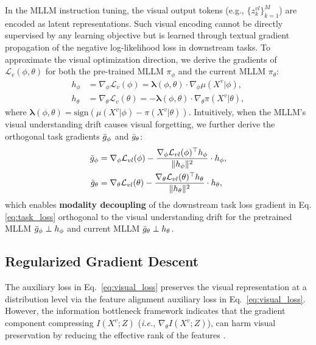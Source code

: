 In the MLLM instruction tuning, the visual output tokens (e.g., $\{z^{vl}_k\}_{k=1}^M$) are encoded as latent representations. 
Such visual encoding cannot be directly supervised by any learning objective but is learned through textual gradient propagation of the negative log-likelihood loss in downstream tasks. 
To approximate the visual optimization direction, we derive the gradients of $\mathcal{L}_v(\phi,\theta)$ for both the pre-trained MLLM $\pi_\phi$ and the current MLLM $\pi_\theta$:
\begin{align*}
    h_{\phi} &= \nabla_{\phi}\mathcal{L}_v(\phi) = \boldsymbol{\lambda}(\phi,\theta) \cdot \nabla_\phi \mu(X^v|\phi), \\
    h_{\theta} &= \nabla_{\theta}\mathcal{L}_v(\theta) = -\boldsymbol{\lambda}(\phi,\theta) \cdot \nabla_\theta \pi(X^v|\theta),
\end{align*}
where $\boldsymbol{\lambda}(\phi,\theta) = \text{sign}\left( \mu(X^v|\phi) - \pi(X^v|\theta) \right)$.
Intuitively, when the MLLM's visual understanding drift causes visual forgetting, we further derive the orthogonal task gradients $\Bar{g}_\phi$ and $\Bar{g}_\theta$:
\begin{align}\label{eq:orth}
    \Bar{g}_\phi &= \nabla_{\phi}\mathcal{L}_{vl}(\phi) - \frac{\nabla_{\phi}\mathcal{L}_{vl}(\phi)^\top h_{\phi}}{\|h_{\phi}\|^2} \cdot h_{\phi}, \\
    \Bar{g}_\theta &= \nabla_{\theta}\mathcal{L}_{vl}(\theta) - \frac{\nabla_{\theta}\mathcal{L}_{vl}(\theta)^\top h_{\theta}}{\|h_{\theta}\|^2} \cdot h_{\theta},
\end{align}
which enables \textbf{modality decoupling} of the downstream task loss gradient in Eq.\eqref{eq:task_loss} orthogonal to the visual understanding drift
for the pretrained MLLM $\Bar{g}_{\phi} \perp h_{\phi}$ and current MLLM $\Bar{g}_{\theta} \perp h_{\theta}$.








\subsection{Regularized Gradient Descent}
The auxiliary loss in Eq.~\eqref{eq:visual_loss} preserves the visual representation at a distribution level via the feature alignment auxiliary loss in Eq.~\eqref{eq:visual_loss}. 
However, the information bottleneck framework indicates that the gradient component compressing $I(X^v; Z)$ (\emph{i.e.}, $\nabla_\theta I(X^v; Z)$), 
can harm visual preservation by reducing the effective rank of the features \cite{achille2018information,lee2021compressive}.

